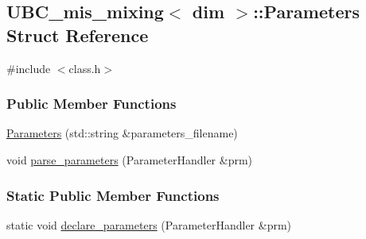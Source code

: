 \hypertarget{struct_u_b_c__mis__mixing_1_1_parameters}{}\subsection{U\+B\+C\+\_\+mis\+\_\+mixing$<$ dim $>$\+:\+:Parameters Struct Reference}
\label{struct_u_b_c__mis__mixing_1_1_parameters}


{\ttfamily \#include $<$class.\+h$>$}

\subsubsection*{Public Member Functions}
\begin{DoxyCompactItemize}
\item 
\hyperlink{struct_u_b_c__mis__mixing_1_1_parameters_ad12e7c5f85bb4262a8713b9dbe250e32}{Parameters} (std\+::string \&parameters\+\_\+filename)
\item 
void \hyperlink{struct_u_b_c__mis__mixing_1_1_parameters_a09e79bcb48f2452c0228415b80fcd2a4}{parse\+\_\+parameters} (Parameter\+Handler \&prm)
\end{DoxyCompactItemize}
\subsubsection*{Static Public Member Functions}
\begin{DoxyCompactItemize}
\item 
static void \hyperlink{struct_u_b_c__mis__mixing_1_1_parameters_afe2e7d873f6f2670ae14f405aeaa67f1}{declare\+\_\+parameters} (Parameter\+Handler \&prm)
\end{DoxyCompactItemize}
